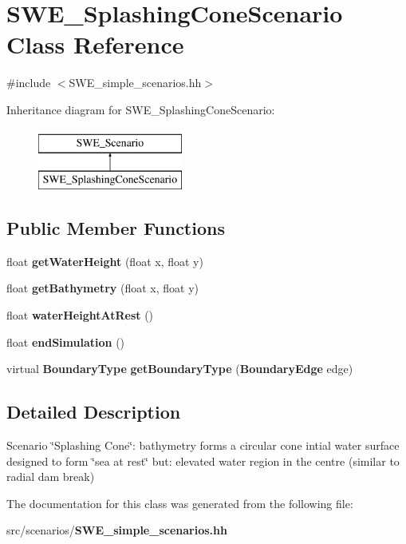 \section{S\-W\-E\-\_\-\-Splashing\-Cone\-Scenario Class Reference}
\label{classSWE__SplashingConeScenario}


{\ttfamily \#include $<$S\-W\-E\-\_\-simple\-\_\-scenarios.\-hh$>$}

Inheritance diagram for S\-W\-E\-\_\-\-Splashing\-Cone\-Scenario\-:\begin{figure}[H]
\begin{center}
\leavevmode
\includegraphics[height=2.000000cm]{classSWE__SplashingConeScenario}
\end{center}
\end{figure}
\subsection*{Public Member Functions}
\begin{DoxyCompactItemize}
\item 
float {\bfseries get\-Water\-Height} (float x, float y)\label{classSWE__SplashingConeScenario_a63d7b91dbd7dce764b12ba76eae856b9}

\item 
float {\bfseries get\-Bathymetry} (float x, float y)\label{classSWE__SplashingConeScenario_a54dff1212b8261e89270f9ab10081cb1}

\item 
float {\bfseries water\-Height\-At\-Rest} ()\label{classSWE__SplashingConeScenario_a430b3220b49368a4d20b69d71c087604}

\item 
float {\bfseries end\-Simulation} ()\label{classSWE__SplashingConeScenario_a464b296fc1905efc2e86aba909cc5188}

\item 
virtual {\bf Boundary\-Type} {\bfseries get\-Boundary\-Type} ({\bf Boundary\-Edge} edge)\label{classSWE__SplashingConeScenario_a8b8353a1f1cd58d9f211ccb32e4f3b33}

\end{DoxyCompactItemize}


\subsection{Detailed Description}
Scenario \char`\"{}\-Splashing Cone\char`\"{}\-: bathymetry forms a circular cone intial water surface designed to form \char`\"{}sea at rest\char`\"{} but\-: elevated water region in the centre (similar to radial dam break) 

The documentation for this class was generated from the following file\-:\begin{DoxyCompactItemize}
\item 
src/scenarios/{\bf S\-W\-E\-\_\-simple\-\_\-scenarios.\-hh}\end{DoxyCompactItemize}

